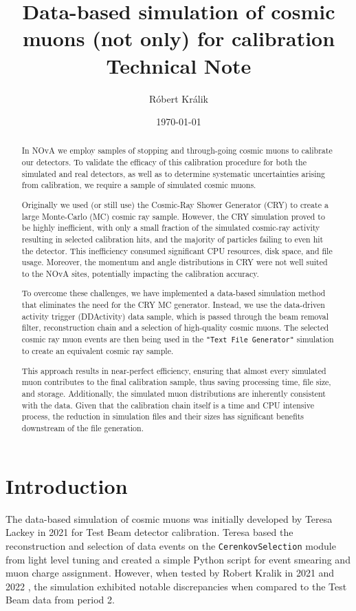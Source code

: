 \documentclass[12pt]{article}
\author[1]{Róbert Králik}
\affil[1]{University of Sussex, Brighton, UK}
\title{\textbf{Data-based simulation of cosmic muons (not only) for calibration\\ \vspace*{5mm}
\Large{Technical Note}}}
\date{\today}
\begin{document}
\maketitle
\begin{abstract}
In NOvA we employ samples of stopping and through-going cosmic muons to calibrate our detectors. To validate the efficacy of this calibration procedure for both the simulated and real detectors, as well as to determine systematic uncertainties arising from calibration, we require a sample of simulated cosmic muons.

Originally we used (or still use) the Cosmic-Ray Shower Generator (CRY) \cite{CRY} to create a large Monte-Carlo (MC) cosmic ray sample. However, the CRY simulation proved to be highly inefficient, with only a small fraction of the simulated cosmic-ray activity resulting in selected calibration hits, and the majority of particles failing to even hit the detector. This inefficiency consumed significant CPU resources, disk space, and file usage. Moreover, the momentum and angle distributions in CRY were not well suited to the NOvA sites, potentially impacting the calibration accuracy.

To overcome these challenges, we have implemented a data-based simulation method that eliminates the need for the CRY MC generator. Instead, we use the data-driven activity trigger (DDActivity) data sample, which is passed through the beam removal filter, reconstruction chain and a selection of high-quality cosmic muons. The selected cosmic ray muon events are then being used in the \texttt{"Text File Generator"} simulation to create an equivalent cosmic ray sample.

This approach results in near-perfect efficiency, ensuring that almost every simulated muon contributes to the final calibration sample, thus saving processing time, file size, and storage. Additionally, the simulated muon distributions are inherently consistent with the data. Given that the calibration chain itself is a time and CPU intensive process, the reduction in simulation files and their sizes has significant benefits downstream of the file generation.
\end{abstract}

\newpage
\tableofcontents

\section{Introduction}
The data-based simulation of cosmic muons was initially developed by Teresa Lackey \cite{LackeyThesis} in 2021 for Test Beam detector calibration. Teresa based the reconstruction and selection of data events on the \texttt{CerenkovSelection} module from light level tuning and created a simple Python script for event smearing and muon charge assignment. However, when tested by Robert Kralik in 2021 and 2022 \cite{NOVA-doc-54417-v1}, the simulation exhibited notable discrepancies when compared to the Test Beam data from period 2.
\end{document}
